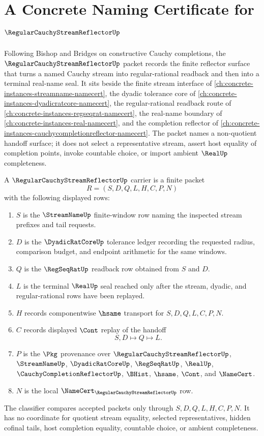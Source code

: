 \chapter{A Concrete Naming Certificate for $\RegularCauchyStreamReflectorUp$}
\label{ch:concrete-instances-regular-cauchy-stream-reflector-namecert}

Following Bishop and Bridges on constructive Cauchy completions, the $\RegularCauchyStreamReflectorUp$ packet records the finite reflector surface that turns a named Cauchy stream into regular-rational readback and then into a terminal real-name seal. It sits beside the finite stream interface of \autoref{ch:concrete-instances-streamname-namecert}, the dyadic tolerance core of \autoref{ch:concrete-instances-dyadicratcore-namecert}, the regular-rational readback route of \autoref{ch:concrete-instances-regseqrat-namecert}, the real-name boundary of \autoref{ch:concrete-instances-real-namecert}, and the completion reflector of \autoref{ch:concrete-instances-cauchycompletionreflector-namecert}. The packet names a non-quotient handoff surface; it does not select a representative stream, assert host equality of completion points, invoke countable choice, or import ambient $\RealUp$ completeness.

\begin{definition}
\label{def:regular-cauchy-stream-reflector-carrier}
A $\RegularCauchyStreamReflectorUp$ carrier is a finite packet
$$
R=(S,D,Q,L,H,C,P,N)
$$
with the following displayed rows:
\begin{enumerate}
\item $S$ is the $\StreamNameUp$ finite-window row naming the inspected stream prefixes and tail requests.
\item $D$ is the $\DyadicRatCoreUp$ tolerance ledger recording the requested radius, comparison budget, and endpoint arithmetic for the same windows.
\item $Q$ is the $\RegSeqRatUp$ readback row obtained from $S$ and $D$.
\item $L$ is the terminal $\RealUp$ seal reached only after the stream, dyadic, and regular-rational rows have been replayed.
\item $H$ records componentwise $\hsame$ transport for $S,D,Q,L,C,P,N$.
\item $C$ records displayed $\Cont$ replay of the handoff
$$
S,D \longmapsto Q \longmapsto L .
$$
\item $P$ is the $\Pkg$ provenance over $\RegularCauchyStreamReflectorUp$, $\StreamNameUp$, $\DyadicRatCoreUp$, $\RegSeqRatUp$, $\RealUp$, $\CauchyCompletionReflectorUp$, $\BHist$, $\hsame$, $\Cont$, and $\NameCert$.
\item $N$ is the local $\NameCert_{\RegularCauchyStreamReflectorUp}$ row.
\end{enumerate}
The classifier compares accepted packets only through $S,D,Q,L,H,C,P,N$. It has no coordinate for quotient stream equality, selected representatives, hidden cofinal tails, host completion equality, countable choice, or ambient completeness.
\end{definition}

